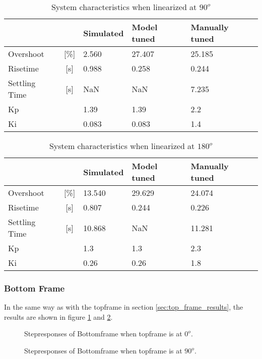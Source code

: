 \documentclass[../../Main]{subfiles}
\begin{document}
\begin{table}[H]
	\centering
	\begin{tabular}{lc|*{3}{l}}
		&&Simulated&Model tuned&Manually tuned\\
		\hline
		Overshoot&[\%]&2.560&27.407&25.185\\
		Risetime&[\si{s}]&0.988&0.258&0.244\\
		Settling Time&[\si{s}]&NaN&NaN&7.235\\
		Kp&&1.39&1.39&2.2\\
		Ki&&0.083&0.083&1.4
	\end{tabular}
	\caption{System characteristics when linearized at $90^o$}
	\label{tab:90_top}
\end{table}


\begin{table}[H]
	\centering
	\begin{tabular}{lc|*{3}{l}}
		&&Simulated&Model tuned&Manually tuned\\
		\hline
		Overshoot&[\%]&13.540&29.629&24.074\\
		Risetime&[\si{s}]&0.807&0.244&0.226\\
		Settling Time&[\si{s}]&10.868&NaN&11.281\\
		Kp&&1.3&1.3&2.3\\
		Ki&&0.26&0.26&1.8
	\end{tabular}
	\caption{System characteristics when linearized at $180^o$}
	\label{tab:180_top}
\end{table}



\subsubsection{Bottom Frame}%
\label{sec:bottom_frame_results}

In the same way as with the topframe in section \ref{sec:top_frame_results}, the results are shown in figure \ref{fig:bot_0} and \ref{fig:bot_90}.

\begin{figure}[H]
  \def\svgwidth{\textwidth}
  
  \caption{Stepresponses of Bottomframe when topframe is at $0^o$.}
  \label{fig:bot_0}
\end{figure}

\begin{figure}[H]
 \def\svgwidth{\textwidth}
 
  \caption{Stepresponses of Bottomframe when topframe is at $90^o$.}
  \label{fig:bot_90}
\end{figure}
\end{document}
